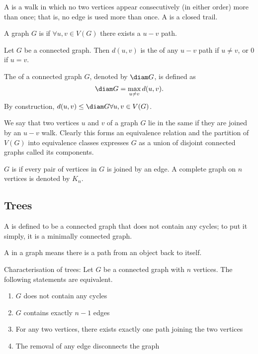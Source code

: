 A  is a walk in which no two vertices appear consecutively (in either order) more than once; that is, no edge is used more than once. A  is a closed trail.

\begin{definition}
A graph $G$ is  if $\forall u,v \in V(G)$ there exists a $u-v$ path.
\end{definition}

Let $G$ be a connected graph. Then $d(u,v)$ is the  of any $u-v$ path if $u \neq v$, or 0 if $u=v$.

The  of a connected graph $G$, denoted by $\diam G$, is defined as
\[ \diam G = \max_{u\neq v} d(u,v). \]
By construction, $d(u,v) \le \diam G \forall u,v \in V(G)$.

We say that two vertices $u$ and $v$ of a graph $G$ lie in the same  if they are joined by an $u-v$ walk. Clearly this forms an equivalence relation and the partition of $V(G)$ into equivalence classes expresses $G$ as a union of disjoint connected graphs called its components.

$G$ is  if every pair of vertices in $G$ is joined by an edge. A complete graph on $n$ vertices is denoted by $K_n$.

\subsection{Trees}
\begin{definition}
A  is defined to be a connected graph that does not contain any cycles; to put it simply, it is a minimally connected graph.
\end{definition}

A  in a graph means there is a path from an object back to itself.

Characterisation of trees: Let $G$ be a connected graph with $n$ vertices. The following statements are equivalent.
\begin{enumerate}
\item $G$ does not contain any cycles
\item $G$ contains exactly $n-1$ edges
\item For any two vertices, there exists exactly one path joining the two vertices
\item The removal of any edge disconnects the graph
\end{enumerate}

